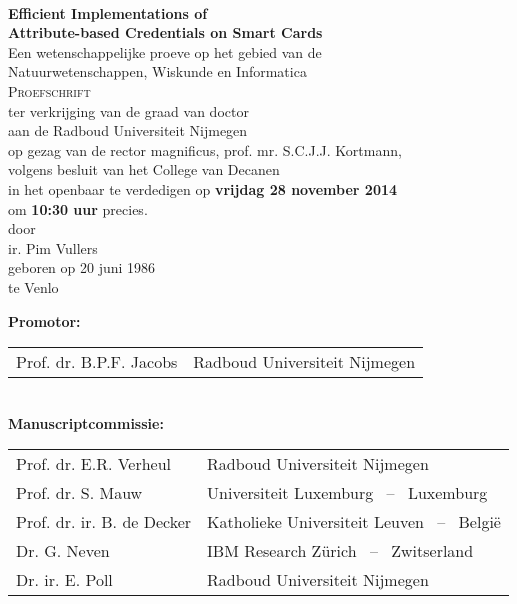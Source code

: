 \thispagestyle{empty}

\begin{center}
  ~ \\[20mm]

  \textbf{\Large Efficient Implementations of\\ Attribute-based Credentials on Smart Cards}\\[15mm]

  Een wetenschappelijke proeve op het gebied van de \\
  Natuurwetenschappen, Wiskunde en Informatica \\[15mm]

  \textsc{Proefschrift} \\[15mm]

  ter verkrijging van de graad van doctor \\
  aan de Radboud Universiteit Nijmegen \\
  op gezag van de rector magnificus, prof. mr. S.C.J.J. Kortmann, \\
  volgens besluit van het College van Decanen \\
  in het openbaar te verdedigen op \textbf{vrijdag 28 november 2014} \\
  om \textbf{10:30 uur} precies. \\[20mm]

  door \\[20mm]

  ir. Pim Vullers \\[15mm]

  geboren op 20 juni 1986 \\
  te Venlo
\end{center}

\clearpage

\thispagestyle{empty}

\noindent\textbf{Promotor:} \\[2mm]
\indent\begin{tabular}{ll}
  Prof. dr. B.P.F. Jacobs & Radboud Universiteit Nijmegen \\
\end{tabular} \\[2mm]

\noindent\textbf{Manuscriptcommissie:} \\[2mm]
\indent\begin{tabular}{ll}
  Prof. dr. E.R. Verheul     & Radboud Universiteit Nijmegen \\
  Prof. dr. S. Mauw          & Universiteit Luxemburg ~--~ Luxemburg \\
  Prof. dr. ir. B. de Decker & Katholieke Universiteit Leuven ~--~ Belgi\"{e} \\
  Dr. G. Neven               & IBM Research Z\"{u}rich ~--~ Zwitserland \\
  Dr. ir. E. Poll            & Radboud Universiteit Nijmegen \\
\end{tabular}
